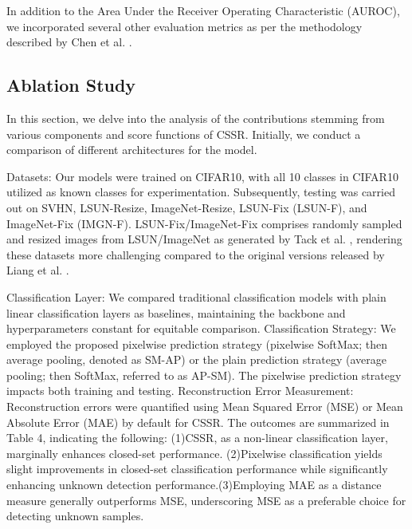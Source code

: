 \documentclass{gji}
\begin{document}
In addition to the Area Under the Receiver Operating Characteristic (AUROC), we incorporated several other evaluation metrics as per the methodology described by Chen et al. \cite{3}.

\subsection{Ablation Study}
In this section, we delve into the analysis of the contributions stemming from various components and score functions of CSSR. Initially, we conduct a comparison of different architectures for the model.

Datasets: Our models were trained on CIFAR10, with all 10 classes in CIFAR10 utilized as known classes for experimentation. Subsequently, testing was carried out on SVHN, LSUN-Resize, ImageNet-Resize, LSUN-Fix (LSUN-F), and ImageNet-Fix (IMGN-F). LSUN-Fix/ImageNet-Fix comprises randomly sampled and resized images from LSUN/ImageNet as generated by Tack et al. \cite{38}, rendering these datasets more challenging compared to the original versions released by Liang et al. \cite{22}.

Classification Layer: We compared traditional classification models with plain linear classification layers as baselines, maintaining the backbone and hyperparameters constant for equitable comparison.
Classification Strategy: We employed the proposed pixelwise prediction strategy (pixelwise SoftMax; then average pooling, denoted as SM-AP) or the plain prediction strategy (average pooling; then SoftMax, referred to as AP-SM). The pixelwise prediction strategy impacts both training and testing.
Reconstruction Error Measurement: Reconstruction errors were quantified using Mean Squared Error (MSE) or Mean Absolute Error (MAE) by default for CSSR.
The outcomes are summarized in Table 4, indicating the following: (1)CSSR, as a non-linear classification layer, marginally enhances closed-set performance.
(2)Pixelwise classification yields slight improvements in closed-set classification performance while significantly enhancing unknown detection performance.(3)Employing MAE as a distance measure generally outperforms MSE, underscoring MSE as a preferable choice for detecting unknown samples.
\end{document}
